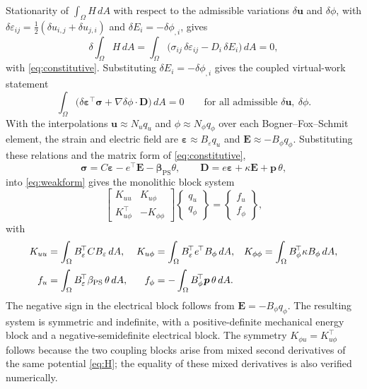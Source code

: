 \documentclass[a4paper,12pt]{elsarticle}
\begin{document}
Stationarity of $\int_\Omega H\,dA$ with respect to the admissible variations
$\delta\bm u$ and $\delta\phi$, with
$\delta\varepsilon_{ij}=\tfrac12(\delta u_{i,j}+\delta u_{j,i})$ and
$\delta E_i=-\delta\phi_{,i}$, gives
\begin{equation}
\delta\!\int_\Omega H\,dA
=\int_\Omega\big(\sigma_{ij}\,\delta\varepsilon_{ij}
-D_i\,\delta E_i\big)\,dA=0,
\label{eq:stationarity}
\end{equation}
with \eqref{eq:constitutive}. Substituting
$\delta E_i=-\delta\phi_{,i}$ gives the coupled virtual-work statement
\begin{equation}
\int_\Omega\big(\delta\bm\varepsilon^{\!\top}\bm\sigma
+\nabla\delta\phi\cdot\bm D\big)\,dA=0
\qquad\text{for all admissible }\delta\bm u,\ \delta\phi.
\label{eq:weakform}
\end{equation}
With the interpolations $\bm u\approx N_uq_u$ and
$\phi\approx N_\phi q_\phi$ over each Bogner--Fox--Schmit element,
the strain and electric field are
$\bm\varepsilon\approx B_\varepsilon q_u$ and
$\bm E\approx-B_\phi q_\phi$. Substituting these relations and the matrix form of
\eqref{eq:constitutive},
\[
\bm\sigma=C\bm\varepsilon-e^{\!\top}\bm E
-\bm\beta_{\mathrm{PS}}\theta,
\qquad
\bm D=e\bm\varepsilon+\kappa\bm E+\bm p\,\theta,
\]
into \eqref{eq:weakform} gives the monolithic block system
\begin{equation}
\begin{bmatrix}
K_{uu} & K_{u\phi}\\
K_{u\phi}^{\!\top} & -K_{\phi\phi}
\end{bmatrix}
\begin{Bmatrix}q_u\\q_\phi\end{Bmatrix}
=
\begin{Bmatrix}f_u\\f_\phi\end{Bmatrix},
\label{eq:global}
\end{equation}
with
{\small
\begin{align}
K_{uu}&=\int_\Omega B_\varepsilon^{\!\top}CB_\varepsilon\,dA, &
K_{u\phi}&=\int_\Omega B_\varepsilon^{\!\top}e^{\!\top}B_\phi\,dA, &
K_{\phi\phi}&=\int_\Omega B_\phi^{\!\top}\kappa B_\phi\,dA,\notag\\[2pt]
f_u&=\int_\Omega B_\varepsilon^{\!\top}\beta_{\mathrm{PS}}\,\theta\,dA, &
f_\phi&=-\int_\Omega B_\phi^{\!\top}\bm p\,\theta\,dA.& &
\label{eq:elementmats}
\end{align}
}
The negative sign in the electrical block follows from
$\bm E=-B_\phi q_\phi$. The resulting system is symmetric and indefinite, with a
positive-definite mechanical energy block and a negative-semidefinite electrical
block. The symmetry
$K_{\phi u}=K_{u\phi}^{\!\top}$ follows because the two coupling blocks arise from
mixed second derivatives of the same potential \eqref{eq:H}; the equality of these
mixed derivatives is also verified numerically.
\end{document}
